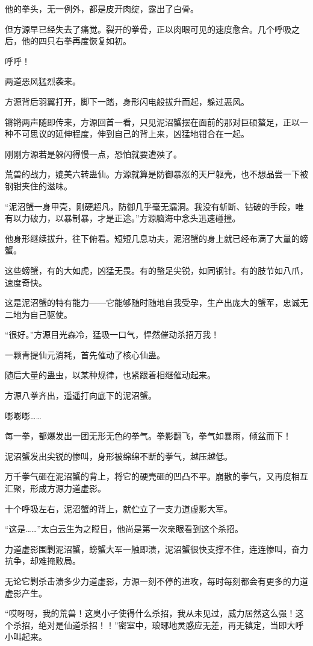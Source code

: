 \begin{this_body}
他的拳头，无一例外，都是皮开肉绽，露出了白骨。

但方源早已经失去了痛觉。裂开的拳骨，正以肉眼可见的速度愈合。几个呼吸之后，他的四只右拳再度恢复如初。

呼呼！

两道恶风猛烈袭来。

方源背后羽翼打开，脚下一踏，身形闪电般拔升而起，躲过恶风。

锵锵两声随即传来，方源回首一看，只见泥沼蟹摆在面前的那对巨硕螯足，正以一种不可思议的延伸程度，伸到自己的背上来，凶猛地钳合在一起。

刚刚方源若是躲闪得慢一点，恐怕就要遭殃了。

荒兽的战力，媲美六转蛊仙。方源就算是防御暴涨的天尸躯壳，也不想品尝一下被钢钳夹住的滋味。

“泥沼蟹一身甲壳，刚硬超凡，防御几乎毫无漏洞。我没有斩断、钻破的手段，唯有以力破力，以暴制暴，才是正途。”方源脑海中念头迅速碰撞。

他身形继续拔升，往下俯看。短短几息功夫，泥沼蟹的身上就已经布满了大量的螃蟹。

这些螃蟹，有的大如虎，凶猛无畏。有的螯足尖锐，如同钢针。有的肢节如八爪，速度奇快。

这是泥沼蟹的特有能力——它能够随时随地自我受孕，生产出庞大的蟹军，忠诚无二地为自己驱使。

“很好。”方源目光森冷，猛吸一口气，悍然催动杀招万我！

一颗青提仙元消耗，首先催动了核心仙蛊。

随后大量的蛊虫，以某种规律，也紧跟着相继催动起来。

方源八拳齐出，遥遥打向底下的泥沼蟹。

嘭嘭嘭……

每一拳，都爆发出一团无形无色的拳气。拳影翻飞，拳气如暴雨，倾盆而下！

泥沼蟹发出尖锐的惨叫，身形被绵绵不断的拳气，越压越低。

万千拳气砸在泥沼蟹的背上，将它的硬壳砸的凹凸不平。崩散的拳气，又再度相互汇聚，形成方源力道虚影。

十个呼吸左右，泥沼蟹的背上，就伫立了一支力道虚影大军。

“这是……”太白云生为之瞠目，他尚是第一次亲眼看到这个杀招。

力道虚影围剿泥沼蟹，螃蟹大军一触即溃，泥沼蟹很快支撑不住，连连惨叫，奋力抗争，却难掩败局。

无论它剿杀击溃多少力道虚影，方源一刻不停的进攻，每时每刻都会有更多的力道虚影产生。

“哎呀呀，我的荒兽！这臭小子使得什么杀招，我从未见过，威力居然这么强！这个杀招，绝对是仙道杀招！！”密室中，琅琊地灵感应无差，再无镇定，当即大呼小叫起来。

\end{this_body}

